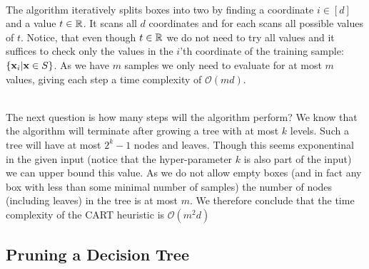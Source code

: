 ~\\The algorithm iteratively splits boxes into two by finding a coordinate $i\in\left[d\right]$ and a value $t\in\mathbb{R}$. It scans all $d$ coordinates and for each scans all possible values of $t$. Notice, that even though $t\in\mathbb{R}$ we do not need to try all values and it suffices to check only the values in the $i$'th coordinate of the training sample: $\left\{\mathbf{x}_i | \mathbf{x}\in S\right\}$. As we have $m$ samples we only need to evaluate for at most $m$ values, giving each step a time complexity of $\mathcal{O}\left(md\right)$.

~\\The next question is how many steps will the algorithm perform? We know that the algorithm will terminate after growing a tree with at most $k$ levels. Such a tree will have at most $2^k-1$ nodes and leaves. Though this seems exponentinal in the given input (notice that the hyper-parameter $k$ is also part of the input) we can upper bound this value. As we do not allow empty boxes (and in fact any box with less than some minimal number of samples) the number of nodes (including leaves) in the tree is at most $m$. We therefore conclude that the time complexity of the CART heuristic is $\mathcal{O}\left(m^2 d\right)$
\subsection{Pruning a Decision Tree}
